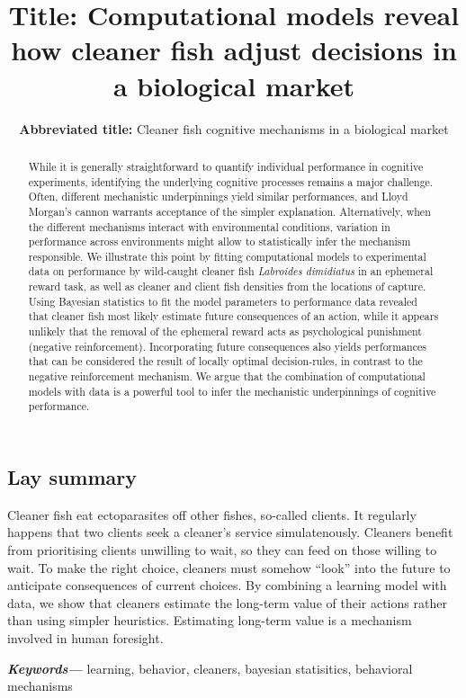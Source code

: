 \documentclass[
  12pt,
]{article}
\title{\large \textbf{Title:} Computational models reveal how cleaner
fish adjust decisions in a biological market}
\subtitle{\normalsize \textbf{Abbreviated title:} Cleaner fish cognitive
mechanisms in a biological market}
\date{}
\providecommand{\keywords}[1]{\textbf{\textit{Keywords---}} #1}
\begin{document}
\maketitle
\begin{flushleft}
\end{flushleft}
\begin{abstract}
While it is generally straightforward to quantify individual performance
in cognitive experiments, identifying the underlying cognitive processes
remains a major challenge. Often, different mechanistic underpinnings
yield similar performances, and Lloyd Morgan's cannon warrants
acceptance of the simpler explanation. Alternatively, when the different
mechanisms interact with environmental conditions, variation in
performance across environments might allow to statistically infer the
mechanism responsible. We illustrate this point by fitting computational
models to experimental data on performance by wild-caught cleaner fish
\emph{Labroides dimidiatus} in an ephemeral reward task, as well as
cleaner and client fish densities from the locations of capture. Using
Bayesian statistics to fit the model parameters to performance data
revealed that cleaner fish most likely estimate future consequences of
an action, while it appears unlikely that the removal of the ephemeral
reward acts as psychological punishment (negative reinforcement).
Incorporating future consequences also yields performances that can be
considered the result of locally optimal decision-rules, in contrast to
the negative reinforcement mechanism. We argue that the combination of
computational models with data is a powerful tool to infer the
mechanistic underpinnings of cognitive performance.
\end{abstract}
\subsection*{Lay summary}
Cleaner fish eat ectoparasites off other fishes, so-called clients. It
regularly happens that two clients seek a cleaner's service
simulatenously. Cleaners benefit from prioritising clients unwilling to
wait, so they can feed on those willing to wait. To make the right
choice, cleaners must somehow ``look'' into the future to anticipate
consequences of current choices. By combining a learning model with
data, we show that cleaners estimate the long-term value of their
actions rather than using simpler heuristics. Estimating long-term value
is a mechanism involved in human foresight.


\keywords{learning, behavior, cleaners, bayesian statisitics, behavioral mechanisms}
\end{document}
